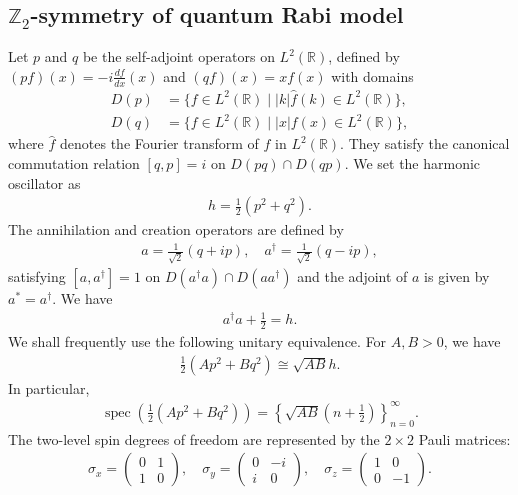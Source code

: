 \documentclass[12pt,dvipdfmx]{article}
\newcommand{\RR}{\mathbb{R}}
\newcommand{\ZZ}{\mathbb{Z}}
\newcommand{\half}{\frac12}
\begin{document}
\subsection{$\ZZ_2$-symmetry of quantum Rabi model}
%
%
Let $p$ and $q$ be the self-adjoint operators on $L^2(\RR)$, defined by $(pf)(x) = -i \frac{df}{dx}(x)$ and $(qf)(x) = xf(x)$ with domains
\begin{align*}
    D(p) &= \{f \in L^2(\RR) \mid |k|\hat{f}(k) \in L^2(\RR) \}, 
    \\
    D(q) &= \{f \in L^2(\RR) \mid |x|f(x) \in L^2(\RR) \},
\end{align*}
where $\hat{f}$ denotes the Fourier transform of $f$ in $L^2(\RR)$. They satisfy the canonical commutation relation $[q,p] = i$ on $D(pq) \cap D(qp)$. 
We set the harmonic oscillator as 
\begin{align}\label{h}
h=\half (p^2+q^2).
\end{align}
The annihilation and creation operators are defined by 
\begin{align*}
    a = \frac{1}{\sqrt{2}} (q + ip),
    \quad 
    a^\dagger = \frac{1}{\sqrt{2}} (q - ip),
\end{align*}
satisfying 
$    [a, a^\dagger] = 1$ 
on $D(a^\dagger a) \cap D(a a^\dagger)$ and the adjoint of $a$ is given by $a^\ast=a^\dagger$. 
    We have
\begin{align*}
    a^\dagger a + \frac12 = h. 
\end{align*}
We shall frequently use the following unitary equivalence.
For $A,B>0$, we have
\begin{align*}
    \frac12 (Ap^2 + Bq^2)
    \cong
    \sqrt{AB} h.
\end{align*}
In particular,
\begin{align*}
    \operatorname{spec}\left(\frac12 (Ap^2 + Bq^2)\right)
    =
    \left\{
        \sqrt{AB} \left(n + \frac12\right)
    \right\}_{n=0}^\infty.
\end{align*}
The two-level spin degrees of freedom are represented by the $2 \times 2$ Pauli matrices:
\begin{align*}
    \sigma_x = \begin{pmatrix} 0 & 1\\ 1 & 0 \end{pmatrix}, \quad
    \sigma_y = \begin{pmatrix} 0 & -i\\ i & 0 \end{pmatrix}, \quad
    \sigma_z = \begin{pmatrix} 1 & 0\\ 0 & -1 \end{pmatrix}.
\end{align*}
\end{document}
